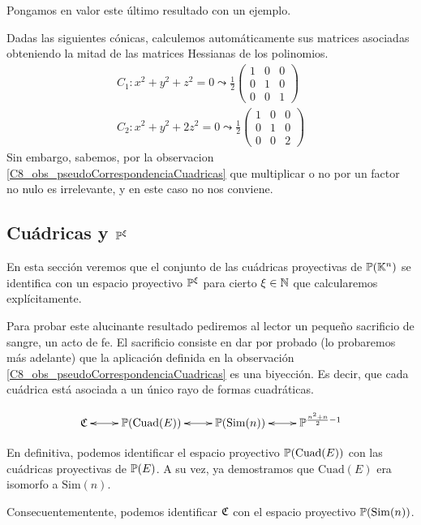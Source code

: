 Pongamos en valor este último resultado con un ejemplo.
\begin{exa}
	Dadas las siguientes cónicas, calculemos automáticamente sus matrices asociadas obteniendo la mitad de las matrices Hessianas de los polinomios.
	\[\begin{array}{c}
	C_1:x^2+y^2+z^2=0\leadsto\frac{1}{2}\begin{pmatrix}
	1 & 0 & 0\\
	0 & 1 & 0\\
	0 & 0 & 1
	\end{pmatrix}\\
	C_2:x^2+y^2+2z^2=0\leadsto\frac{1}{2}\begin{pmatrix}
	1 & 0 & 0\\
	0 & 1 & 0\\
	0 & 0 & 2
	\end{pmatrix}
	\end{array}\]
	Sin embargo, sabemos, por la observacion \ref{C8_obs_pseudoCorrespondenciaCuadricas} que multiplicar o no por un factor no nulo es irrelevante, y en este caso no nos conviene.
\end{exa}
\subsection{Cuádricas y $\mathbb{P}^\xi$}
En esta sección veremos que el conjunto de las cuádricas proyectivas de $\mathbb{P}(\mathbb{K}^n)$ se identifica con un espacio proyectivo $\mathbb{P}^\xi$ para cierto $\xi\in\mathbb{N}$ que calcularemos explícitamente.

Para probar este alucinante resultado pediremos al lector un pequeño sacrificio de sangre, un acto de fe. El sacrificio consiste en dar por probado (lo probaremos más adelante) que la aplicación definida en la observación \ref{C8_obs_pseudoCorrespondenciaCuadricas} es una biyección. Es decir, que cada cuádrica está asociada a un único rayo de formas cuadráticas.

\[
\xymatrix
{
	\mf{C} \ar@{<->}[r]& \proy(\mathrm{Cuad}(E)) \ar@{<->}[r]& \proy(\mathrm{Sim}(n)) \ar@{<->}[r]& \proy^{\frac{n^2+n}{2}-1}
}
\]

En definitiva, podemos identificar el espacio proyectivo $\mathbb{P}(\mathrm{Cuad}(E))$ con las cuádricas proyectivas de $\mathbb{P}(E)$. A su vez, ya demostramos que $\mathrm{Cuad}(E)$ era isomorfo a $\mathrm{Sim}(n)$.

Consecuentementente, podemos identificar $\mathfrak{C}$ con el espacio proyectivo $\mathbb{P}(\mathrm{Sim}(n))$.


